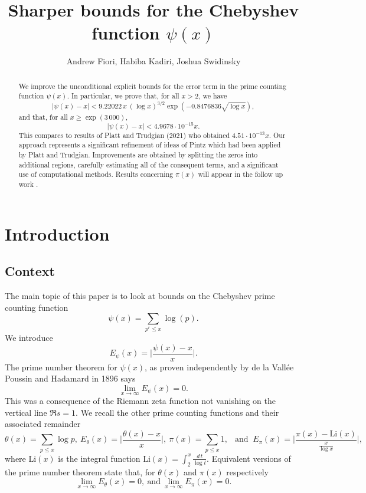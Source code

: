 \documentclass[10pt]{amsart}
\title[Sharper bounds for the Chebyshev function $\psi(x)$]{Sharper bounds for the Chebyshev function $\psi(x)$}
\author{Andrew Fiori, Habiba Kadiri, Joshua Swidinsky}
\theoremstyle{definition}
\numberwithin{equation}{section}
\begin{document}
\maketitle

\begin{abstract}
We improve the unconditional explicit bounds for the error term in the prime counting function $\psi(x)$. In particular, we prove that, for all $x>2$, we have
\[
\left| \psi(x)-x \right|   <  9.22022 \, x \, (\log x)^{3/2} \exp(-0.8476836\sqrt{\log x}),
\]
and that, for all $x \ge \exp(3\,000)$,
\[
\left| \psi(x)-x \right|  <  4.9678 \cdot 10^{-15} x.
\]
This compares to results of Platt and Trudgian (2021) who obtained $4.51\cdot 10^{-13} x $.
Our approach represents a significant refinement of ideas of Pintz which had been applied by Platt and Trudgian. Improvements are obtained by splitting the zeros into additional regions, carefully estimating all of the consequent terms, and a significant use of computational methods. 
Results concerning $\pi(x)$ will appear in the follow up work \cite{FioKadSwi22+}.
\end{abstract}

\section{Introduction}

\subsection{Context}

The main topic of this paper is to look at bounds on the Chebyshev prime counting function 
\[ \psi(x) = \sum_{p^r \le x} \log(p) .\]
We introduce
\begin{equation}\label{def-et-pnt}
E_{\psi}(x)= \Big|\frac{\psi(x)-x}{x}\Big|.
\end{equation}
The prime number theorem for $\psi(x)$, as proven independently by de la Vall\'ee Poussin and Hadamard in 1896 says
\begin{equation}\label{pnt}
\lim_{x\to\infty} E_{\psi}(x) = 0. 
\end{equation}
This was a consequence of the Riemann zeta function not vanishing on the vertical line $\Re s=1$. 
We recall the other prime counting functions and their associated remainder
\begin{equation}\label{def-et-pnt-theta-pi}
\theta(x) = \sum_{p\le x} \log p,\ 
E_{\theta}(x)= \Big|\frac{\theta(x)-x}{x}\Big|,\ 
\pi(x)= \sum_{p\le x} 1,\ 
\ \text{ and }\ 
E_{\pi}(x)= \Big|\frac{\pi(x)-\textrm{Li}(x)}{\frac{x}{\log x}}\Big|,
\end{equation}
where $\textrm{Li}(x)$ is the integral function $\textrm{Li}(x) = \int_2^x \frac{d\,t}{\log t}$.
Equivalent versions of the prime number theorem state that, for $\theta(x)$ and $\pi(x)$ respectively
\begin{equation}\label{pnt-theta-pi}
\lim_{x\to\infty} E_{\theta}(x) = 0, \ \text{and} \ \lim_{x\to\infty} E_{\pi}(x) = 0.
\end{equation}
\end{document}

